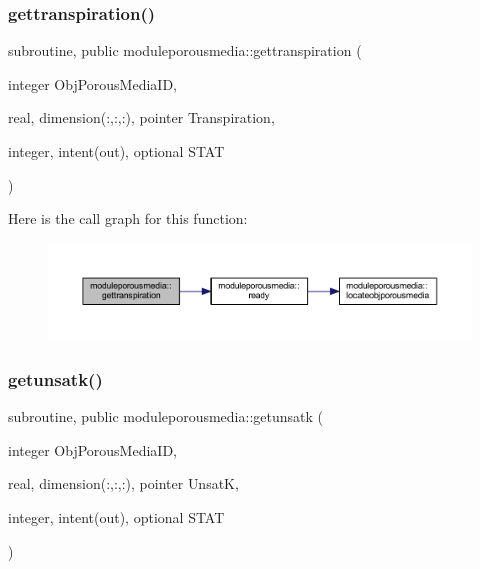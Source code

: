 \subsubsection{\texorpdfstring{gettranspiration()}{gettranspiration()}}
{\footnotesize\ttfamily subroutine, public moduleporousmedia\+::gettranspiration (\begin{DoxyParamCaption}\item[{integer}]{Obj\+Porous\+Media\+ID,  }\item[{real, dimension(\+:,\+:,\+:), pointer}]{Transpiration,  }\item[{integer, intent(out), optional}]{S\+T\+AT }\end{DoxyParamCaption})}

Here is the call graph for this function\+:\nopagebreak
\begin{figure}[H]
\begin{center}
\leavevmode
\includegraphics[width=350pt]{namespacemoduleporousmedia_ad069d36e784e065b5145cf9e5a29e786_cgraph}
\end{center}
\end{figure}
\mbox{\label{namespacemoduleporousmedia_a8bdcde0305ffa37c3f25774f880927af}} 
\subsubsection{\texorpdfstring{getunsatk()}{getunsatk()}}
{\footnotesize\ttfamily subroutine, public moduleporousmedia\+::getunsatk (\begin{DoxyParamCaption}\item[{integer}]{Obj\+Porous\+Media\+ID,  }\item[{real, dimension(\+:,\+:,\+:), pointer}]{UnsatK,  }\item[{integer, intent(out), optional}]{S\+T\+AT }\end{DoxyParamCaption})}

